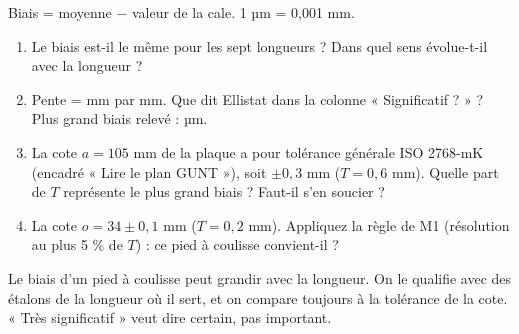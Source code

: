 \documentclass[10pt,a4paper]{article}
\begin{document}
\par{\small Biais = moyenne $-$ valeur de la cale. 1 µm = 0,001 mm.}\par
\newpage
{}
\begin{enumerate}[label=\textcolor{cyan}{\textbf{Q\arabic*.}},leftmargin=22pt]
\item Le biais est-il le même pour les sept longueurs ? Dans quel sens évolue-t-il avec la longueur ?\reponse[2]
\item Pente = \champ{18mm} mm par mm. Que dit Ellistat dans la colonne « Significatif ? » ? Plus grand biais relevé : \champ{14mm} µm.\reponse[1]
\item La cote $a = 105$ mm de la plaque a pour tolérance générale ISO 2768-mK (encadré « Lire le plan GUNT »), soit $\pm 0{,}3$ mm ($T = 0{,}6$ mm). Quelle part de $T$ représente le plus grand biais ? Faut-il s'en soucier ?\reponse[2]
\item La cote $o = 34 \pm 0{,}1$ mm ($T = 0{,}2$ mm). Appliquez la règle de M1 (résolution au plus 5 \% de $T$) : ce pied à coulisse convient-il ?\reponse[2]
\end{enumerate}
\begin{tcolorbox}[retenir]Le biais d'un pied à coulisse peut grandir avec la longueur. On le qualifie avec des étalons de la longueur où il sert, et on compare toujours à la tolérance de la cote. « Très significatif » veut dire certain, pas important.\end{tcolorbox}
\end{document}
